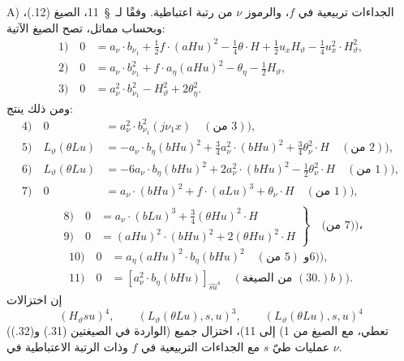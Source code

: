 \documentclass[11pt]{article}
\begin{document}
A) الجداءات تربيعية في $f$، والرموز $\nu$ من رتبة اعتباطية. وفقًا لـ~\S\ 11، الصيغ (12.)، وبحساب مماثل، تصح الصيغ الآتية:
\begin{align*}
1)\quad 0&=a_\nu\cdot b_{\nu_1}+\frac12f\cdot(aHu)^2-\frac14\theta\cdot H+\frac12u_xH_\vartheta-\frac14u_x^2\cdot H_\vartheta^2,\\
2)\quad 0&=a_\nu\cdot b_{\nu_1}^2+f\cdot a_\eta(aHu)^2-\theta_\eta-\frac12H_\vartheta,\\
3)\quad 0&=a_\nu^2\cdot b_{\nu_1}^2-H_\vartheta^2+2\theta_\eta^2.
\end{align*}
ومن ذلك ينتج:
\begin{align*}
4)\quad 0&=a_\nu^2\cdot b_{\nu_1}^2(j\nu_1x)\quad(\text{من }3)),\\
5)\quad L_\vartheta(\theta Lu)&=-a_\nu\cdot b_\eta(bHu)^2+\frac34a_\nu^2\cdot(bHu)^2+\frac34\theta_\nu^2\cdot H\quad(\text{من }2)),\\
6)\quad L_\vartheta(\theta Lu)&=-6a_\nu\cdot b_\eta(bHu)^2+2a_\nu^2\cdot(bHu)^2-\frac12\theta_\nu^2\cdot H\quad(\text{من }1)),\\
7)\quad 0&=a_\nu\cdot(bHu)^2+f\cdot(aLu)^3+\theta_\nu\cdot H\quad(\text{من }1)),\\
\end{align*}
\[
\left.
\begin{aligned}
8)\quad 0&=a_\nu\cdot(bLu)^3+\frac34(\theta Hu)^2\cdot H\\
9)\quad 0&=(aHu)^2\cdot(bHu)^2+2(\theta Hu)^2\cdot H
\end{aligned}
\right\}\quad\text{(من }7)\text{)،}
\]
\begin{align*}
10)\quad 0&=a_\eta(aHu)^2\cdot b_\eta(bHu)^2\quad(\text{من }5)\text{ و}6)),\\
11)\quad 0&= [a_\nu^2\cdot b_\eta(bHu)]_{\widehat{su}^4}\quad(\text{من الصيغة }(30.)b)).
\end{align*}
إن اختزالات
\[
(H_\vartheta su)^4,
\qquad (L_\vartheta(\theta Lu),s,u)^3,
\qquad (L_\vartheta(\theta Lu),s,u)^4
\]
(الواردة في الصيغتين (31.) و(32.)) تعطي، مع الصيغ من 1) إلى 11)، اختزال جميع عمليات طيّ $s$ مع الجداءات التربيعية في $f$ وذات الرتبة الاعتباطية في $\nu$.
\end{document}
